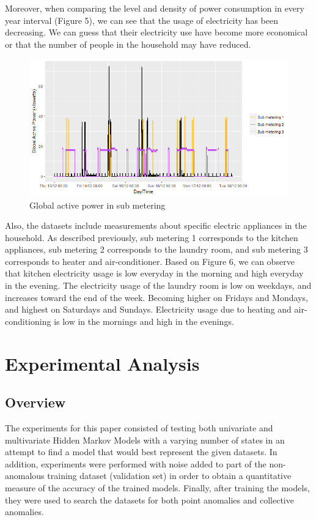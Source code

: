\documentclass[letterpaper, 11pt]{article}%
\begin{document}
Moreover, when comparing the level and density of power consumption in every year interval (Figure 5), we can see that the usage of electricity has been decreasing. We can guess that their electricity use have become more economical or that the number of people in the household may have reduced.
\begin{figure}[H]
  \centering
  \includegraphics[scale=0.4]{fig5}
  \caption{Global active power in sub metering}
\end{figure}
Also, the datasets include measurements about specific electric appliances in the household. As described previously, sub metering 1 corresponds to the kitchen appliances, sub metering 2 corresponds to the laundry room, and sub metering 3 corresponds to heater and air-conditioner. Based on Figure 6, we can observe that kitchen electricity usage is low everyday in the morning and high everyday in the evening. The electricity usage of the laundry room is low on weekdays, and increases toward the end of the week. Becoming higher on Fridays and Mondays, and highest on Saturdays and Sundays. Electricity usage due to heating and air-conditioning is low in the mornings and high in the evenings. 

\section{Experimental Analysis}
\subsection{Overview}
The experiments for this paper consisted of testing both univariate and multivariate Hidden Markov Models with a varying number of states in an attempt to find a model that would best represent the given datasets. In addition, experiments were performed with noise added to part of the non-anomalous training dataset (validation set) in order to obtain a quantitative measure of the accuracy of the trained models. Finally, after training the models, they were used to search the datasets for both point anomalies and collective anomalies. 
\end{document}
